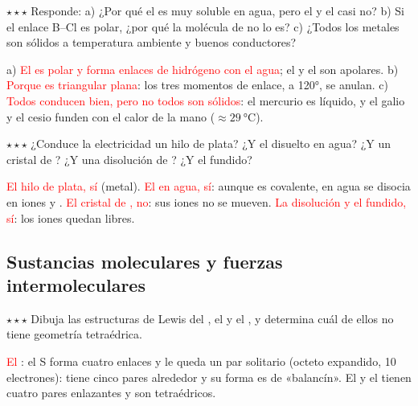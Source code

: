 \begin{exercise}
    \(\star\star\star\) Responde: a) ¿Por qué el  es muy soluble en agua, pero el  y el  casi no?
    b) Si el enlace B--Cl es polar, ¿por qué la molécula de  no lo es? c) ¿Todos los metales son sólidos a temperatura
    ambiente y buenos conductores?
    \begin{solu}
        a) \textcolor{red}{El  es polar y forma enlaces de hidrógeno con el agua}; el  y el  son apolares.
        b) \textcolor{red}{Porque es triangular plana}: los tres momentos de enlace, a \ang{120}, se anulan. c)
        \textcolor{red}{Todos conducen bien, pero no todos son sólidos}: el mercurio es líquido, y el galio y el cesio funden con
        el calor de la mano (\(\approx \qty{29}{\degreeCelsius}\)).
    \end{solu}
\end{exercise}

\begin{exercise}
    \(\star\star\star\) ¿Conduce la electricidad un hilo de plata? ¿Y el  disuelto en agua? ¿Y un cristal de ?
    ¿Y una disolución de ? ¿Y el  fundido?
    \begin{solu}
        \textcolor{red}{El hilo de plata, sí} (metal). \textcolor{red}{El  en agua, sí}: aunque es covalente, en agua se
        disocia en iones  y . \textcolor{red}{El cristal de , no}: sus iones no se mueven.
        \textcolor{red}{La disolución y el  fundido, sí}: los iones quedan libres.
    \end{solu}
\end{exercise}

\subsection{Sustancias moleculares y fuerzas intermoleculares}

\begin{exercise}
    \(\star\star\star\) Dibuja las estructuras de Lewis del , el  y el , y determina cuál de ellos no
    tiene geometría tetraédrica.
    \begin{solu}
        \textcolor{red}{El }: el S forma cuatro enlaces y le queda un par solitario (octeto expandido, 10 electrones): tiene
        cinco pares alrededor y su forma es de «balancín». El  y el  tienen cuatro pares enlazantes y son
        tetraédricos.
    \end{solu}
\end{exercise}

